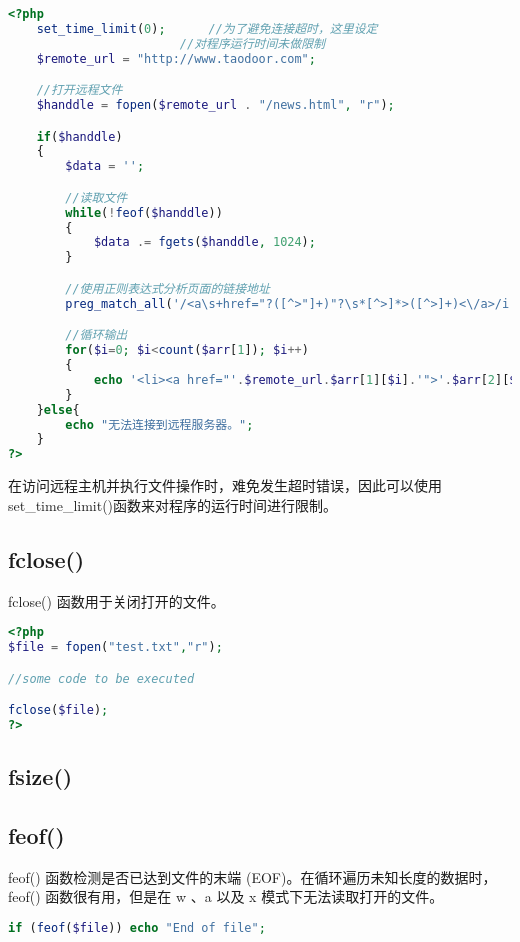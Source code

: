 \begin{lstlisting}[language=PHP]
<?php
	set_time_limit(0);		//为了避免连接超时，这里设定
						//对程序运行时间未做限制
	$remote_url = "http://www.taodoor.com";

	//打开远程文件
	$handdle = fopen($remote_url . "/news.html", "r");

	if($handdle)
	{
		$data = '';

		//读取文件
		while(!feof($handdle))
		{
			$data .= fgets($handdle, 1024);
		}

		//使用正则表达式分析页面的链接地址
		preg_match_all('/<a\s+href="?([^>"]+)"?\s*[^>]*>([^>]+)<\/a>/i',$data,$arr);

		//循环输出
		for($i=0; $i<count($arr[1]); $i++)
		{
			echo '<li><a href="'.$remote_url.$arr[1][$i].'">'.$arr[2][$i].'</a>';
		}
	}else{
		echo "无法连接到远程服务器。";
	}
?>
\end{lstlisting}

在访问远程主机并执行文件操作时，难免发生超时错误，因此可以使用set\_time\_limit()函数来对程序的运行时间进行限制。




\subsection{fclose()}

fclose() 函数用于关闭打开的文件。

\begin{lstlisting}[language=PHP]
<?php
$file = fopen("test.txt","r");

//some code to be executed

fclose($file);
?>
\end{lstlisting}


\subsection{fsize()}


\subsection{feof()}


feof() 函数检测是否已达到文件的末端 (EOF)。在循环遍历未知长度的数据时，feof() 函数很有用，但是在 w 、a 以及 x 模式下无法读取打开的文件。


\begin{lstlisting}[language=PHP]
if (feof($file)) echo "End of file";
\end{lstlisting}



